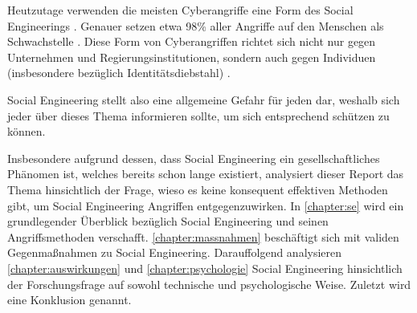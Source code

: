 Heutzutage verwenden die meisten Cyberangriffe eine Form des Social Engineerings .
Genauer setzen etwa 98\% aller Angriffe auf den Menschen als Schwachstelle .
Diese Form von Cyberangriffen richtet sich nicht nur gegen Unternehmen und Regierungsinstitutionen,
sondern auch gegen Individuen (insbesondere bezüglich Identitätsdiebstahl) .

Social Engineering stellt also eine allgemeine Gefahr für jeden dar, weshalb sich jeder über dieses
Thema informieren sollte, um sich entsprechend schützen zu können.

Insbesondere aufgrund dessen, dass Social Engineering ein gesellschaftliches Phänomen ist, welches bereits
schon lange existiert, analysiert dieser Report das Thema hinsichtlich der Frage, wieso es keine konsequent effektiven
Methoden gibt, um Social Engineering Angriffen entgegenzuwirken.
In \autoref{chapter:se} wird ein grundlegender Überblick bezüglich Social Engineering und seinen Angriffsmethoden verschafft.
\autoref{chapter:massnahmen} beschäftigt sich mit validen Gegenmaßnahmen zu Social Engineering.
Darauffolgend analysieren \autoref{chapter:auswirkungen} und \autoref{chapter:psychologie} Social Engineering hinsichtlich der
Forschungsfrage auf sowohl technische und psychologische Weise. Zuletzt wird eine Konklusion genannt.
